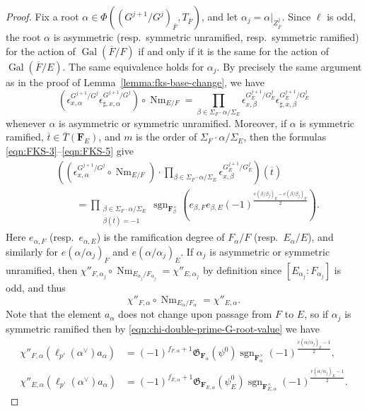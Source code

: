 \documentclass[reqno]{amsart}
\numberwithin{equation}{subsection}
\newcommand{\F}{\mathbf{F}}
\newcommand{\sgn}{\operatorname{sgn}}
\newcommand{\Gal}{\operatorname{Gal}}
\newcommand{\ol}[1]{\overline{#1}}
\newcommand\frG{\mathfrak{G}}
\DeclareMathOperator{\Nm}{Nm}
\theoremstyle{remark}
\numberwithin{equation}{subsection}
\numberwithin{figure}{subsection}
\begin{document}
\begin{proof}
Fix a root $\alpha \in \Phi((G^{j+1}/G^j)_{\ol F}, T_{\ol F})$, and let $\alpha_j = \alpha|_{Z^j_{\ol F}}$. Since $\ell$ is odd, the root $\alpha$ is asymmetric (resp.\ symmetric unramified, resp.\ symmetric ramified) for the action of $\Gal(\ol F/F)$ if and only if it is the same for the action of $\Gal(\ol F/E)$. The same equivalence holds for $\alpha_j$. By precisely the same argument as in the proof of Lemma~\ref{lemma:fks-base-change}, we have
\begin{equation}\label{eqn:norm-relation-asym-sym-unram}
(\epsilon_{x,\alpha}^{G^{j+1}/G^j}\epsilon_{\sharp,x,\alpha}^{G^{j+1}/G^j}) \circ \Nm_{E/F} = \prod_{\beta \in \Sigma_F\cdot\alpha/\Sigma_E} \epsilon_{x,\beta}^{G^{j+1}_E/G^j_E}\epsilon_{\sharp,x,\beta}^{G^{j+1}_E/G^j_E}
\end{equation}
whenever $\alpha$ is asymmetric or symmetric unramified. Moreover, if $\alpha$ is symmetric ramified, $\ol t \in \ol T(\F_E)$, and $m$ is the order of $\Sigma_F \cdot \alpha/\Sigma_E$, then the formulas \eqref{eqn:FKS-3}--\eqref{eqn:FKS-5} give
\begin{equation}\label{eqn:norm-relation-sym-ram}
\begin{aligned}
&((\epsilon_{x,\alpha}^{G^{j+1}/G^j} \circ \Nm_{E/F}) \cdot \prod_{\beta \in \Sigma_F \cdot \alpha/\Sigma_E} \epsilon_{x,\beta}^{G^{j+1}_E/G^j_E})(\ol t) \\
&\qquad= \prod_{\substack{\beta \in \Sigma_F \cdot \alpha/\Sigma_E \\ \beta(\ol t)=-1}}
\sgn_{\F_\beta^\times}\left(e_{\beta,F}e_{\beta,E}(-1)^{\frac{e(\beta/\beta_j)_E-e(\beta/\beta_j)_F}{2}}\right).
\end{aligned}
\end{equation}
Here $e_{\alpha,F}$ (resp.\ $e_{\alpha,E}$) is the ramification degree of $F_\alpha/F$ (resp.\ $E_\alpha/E$), and similarly for $e(\alpha/\alpha_j)_F$ and $e(\alpha/\alpha_j)_E$. If $\alpha_j$ is asymmetric or symmetric unramified, then $\chi''_{F,\alpha_j} \circ \Nm_{E_{\alpha_j}/F_{\alpha_j}} = \chi''_{E,\alpha_j}$ by definition since $[E_{\alpha_j}:F_{\alpha_j}]$ is odd, and thus 
\begin{equation}\label{eqn:asym-sym-unram-chi-data-bc}
    \chi''_{F,\alpha} \circ \Nm_{E_\alpha/F_\alpha} = \chi''_{E,\alpha}.
\end{equation}
Note that the element $a_\alpha$ does not change upon passage from $F$ to $E$, so if $\alpha_j$ is symmetric ramified then by \eqref{eqn:chi-double-prime-G-root-value} we have
\begin{equation}\label{eqn:symmetric-ramified-chi-data-bc}
\begin{aligned}
\chi''_{F,\alpha}(\ell_{p'}(\alpha^\vee)a_\alpha) &= (-1)^{f_{F,\alpha} + 1}\frG_{\F_\alpha}(\psi^0)\sgn_{\F_\alpha^\times}(-1)^{\frac{e(\alpha/\alpha_j)_F-1}{2}}, \\
\chi''_{E,\alpha}(\ell_{p'}(\alpha^\vee)a_\alpha) &= (-1)^{f_{E,\alpha} + 1}\frG_{\F_{E,\alpha}}(\psi_E^0)\sgn_{\F_{E,\alpha}^\times}(-1)^{\frac{e(\alpha/\alpha_j)_E-1}{2}}.
\end{aligned}
\end{equation}


\end{proof}
\end{document}
